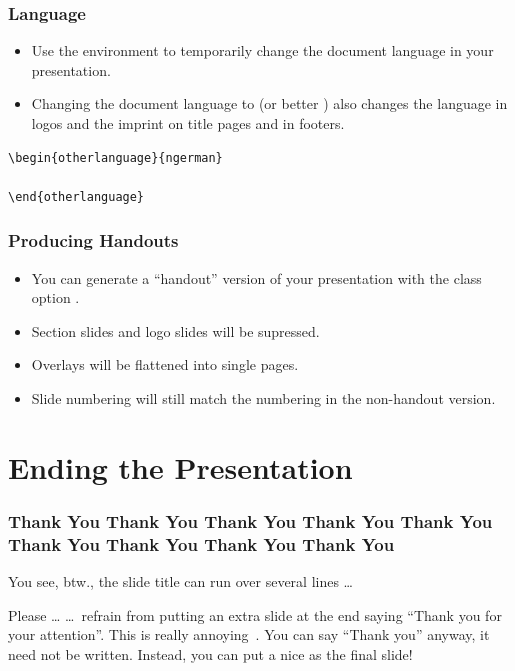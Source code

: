 \documentclass[utf8,aspectratio=169,ngerman,english]{beamer}
\begin{document}
\begin{otherlanguage}{ngerman}
\begin{frame}[fragile]
\frametitle{Language}
\begin{itemize}
\item Use the  environment to temporarily change the document language in your presentation.
\item Changing the document language to  (or better ) also changes the language in logos and the imprint on title pages and in footers.
\end{itemize}

\begin{lstlisting}[language={[LaTeX]TeX},numbers=none]
\begin{otherlanguage}{ngerman}

\end{otherlanguage}
\end{lstlisting}
\end{frame}
\end{otherlanguage}


\begin{frame}[label=handout]
\frametitle{Producing Handouts}

\begin{itemize}
\item You can generate a ``handout'' version of your presentation with the class option .
\item Section slides and logo slides will be supressed.
\item Overlays will be flattened into single pages.
\item Slide numbering will still match the numbering in the non-handout version.
\end{itemize}
\end{frame}


\section{Ending the Presentation}

\begin{frame}
\frametitle{Thank You Thank You Thank You Thank You Thank You Thank You Thank You Thank You Thank You}

You see, btw., the slide title can run over several lines \ldots

\bigskip
\begin{alertblock}{Please \ldots}
\ldots\ refrain from putting an extra slide at the end saying ``\alert{Thank you for your attention}''. This is really annoying~\cite{schultz,karol}. You can say ``Thank you'' anyway, it need not be written. Instead, you can put a nice \textverb{\string\jkulogo} as the final slide!
\end{alertblock}

\end{frame}
\end{document}
